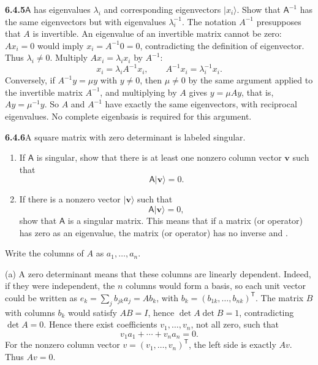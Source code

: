 \par\bigskip
\noindent\textbf{6.4.5}\quad $\mathsf{A}$ has eigenvalues $\lambda_{i}$ and
corresponding eigenvectors $|x_{i}\rangle$. Show that $\mathsf{A}^{-1}$ has
the same eigenvectors but with eigenvalues $\lambda_{i}^{-1}$.
\solution
The notation $A^{-1}$ presupposes that $A$ is invertible.
An eigenvalue of an invertible matrix cannot be zero: $Ax_i=0$ would
imply $x_i=A^{-1}0=0$, contradicting the definition of eigenvector.
Thus $\lambda_i\ne0$. Multiply $Ax_i=\lambda_i x_i$ by $A^{-1}$:
\[
x_i=\lambda_i A^{-1}x_i,
\qquad
\boxed{A^{-1}x_i=\lambda_i^{-1}x_i.}
\]
Conversely, if $A^{-1}y=\mu y$ with $y\ne0$, then $\mu\ne0$ by the
same argument applied to the invertible matrix $A^{-1}$, and
multiplying by $A$ gives $y=\mu Ay$, that is, $Ay=\mu^{-1}y$. So $A$
and $A^{-1}$ have exactly the same eigenvectors, with reciprocal
eigenvalues. No complete eigenbasis is required for this argument.

\par\bigskip
\noindent\textbf{6.4.6}\quad A square matrix with zero determinant is labeled
singular.
\begin{enumerate}
\item[(a)] If $\mathsf{A}$ is singular, show that there is at least one
  nonzero column vector $\mathbf{v}$ such that
  \[
  \mathsf{A}|\mathbf{v}\rangle=0.
  \]
\item[(b)] If there is a nonzero vector $|\mathbf{v}\rangle$ such that
  \[
  \mathsf{A}|\mathbf{v}\rangle=0,
  \]
  show that $\mathsf{A}$ is a singular matrix. This means that if a matrix (or
  operator) has zero as an eigenvalue, the matrix (or operator) has no inverse
  and .
\end{enumerate}
\solution
Write the columns of $A$ as $a_1,\ldots,a_n$.

(a) A zero determinant means that these columns are linearly dependent.
Indeed, if they were independent, the $n$ columns would form a basis,
so each unit vector could be written as
$e_k=\sum_jb_{jk}a_j=Ab_k$, with $b_k=(b_{1k},\ldots,b_{nk})^{\mathsf T}$.
The matrix $B$ with columns $b_k$ would satisfy $AB=I$, hence
$\det A\det B=1$, contradicting $\det A=0$.
Hence there exist coefficients $v_1,\ldots,v_n$, not all zero, such that
\[
v_1a_1+\cdots+v_na_n=0.
\]
For the nonzero column vector $v=(v_1,\ldots,v_n)^{\mathsf T}$, the
left side is exactly $Av$. Thus $Av=0$.

